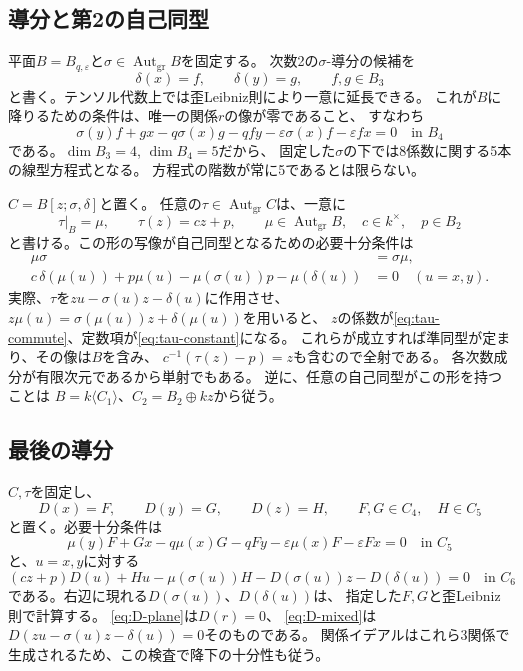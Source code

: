 \documentclass[11pt,a4paper]{ltjsarticle}
\theoremstyle{definition}
\newcommand{\Aut}{\operatorname{Aut}}
\begin{document}
\subsection{導分と第2の自己同型}
平面$B=B_{q,\varepsilon}$と$\sigma\in\Aut_{\mathrm{gr}}B$を固定する。
次数2の$\sigma$-導分の候補を
\[
\delta(x)=f,\qquad \delta(y)=g,\qquad f,g\in B_3
\]
と書く。テンソル代数上では歪Leibniz則により一意に延長できる。
これが$B$に降りるための条件は、唯一の関係$r$の像が零であること、
すなわち
\begin{equation}\label{eq:delta-condition}
\sigma(y)f+gx-q\sigma(x)g-qfy
-\varepsilon\sigma(x)f-\varepsilon fx=0\quad\text{in }B_4
\end{equation}
である。$\dim B_3=4$, $\dim B_4=5$だから、
固定した$\sigma$の下では8係数に関する5本の線型方程式となる。
方程式の階数が常に5であるとは限らない。

$C=B[z;\sigma,\delta]$と置く。
任意の$\tau\in\Aut_{\mathrm{gr}}C$は、一意に
\begin{equation}\label{eq:tau-form}
\tau|_B=\mu,\qquad \tau(z)=cz+p,\qquad
\mu\in\Aut_{\mathrm{gr}}B,\quad c\in k^\times,\quad p\in B_2
\end{equation}
と書ける。この形の写像が自己同型となるための必要十分条件は
\begin{align}
\mu\sigma&=\sigma\mu,\label{eq:tau-commute}\\
c\,\delta(\mu(u))+p\mu(u)
-\mu(\sigma(u))p-\mu(\delta(u))&=0
\quad(u=x,y).\label{eq:tau-constant}
\end{align}
実際、$\tau$を$zu-\sigma(u)z-\delta(u)$に作用させ、
$z\mu(u)=\sigma(\mu(u))z+\delta(\mu(u))$を用いると、
$z$の係数が\eqref{eq:tau-commute}、定数項が\eqref{eq:tau-constant}になる。
これらが成立すれば準同型が定まり、その像は$B$を含み、
$c^{-1}(\tau(z)-p)=z$も含むので全射である。
各次数成分が有限次元であるから単射でもある。
逆に、任意の自己同型がこの形を持つことは
$B=k\langle C_1\rangle$、$C_2=B_2\oplus kz$から従う。

\subsection{最後の導分}
$C,\tau$を固定し、
\[
D(x)=F,\qquad D(y)=G,\qquad D(z)=H,\qquad
F,G\in C_4,\quad H\in C_5
\]
と置く。必要十分条件は
\begin{equation}\label{eq:D-plane}
\mu(y)F+Gx-q\mu(x)G-qFy
-\varepsilon\mu(x)F-\varepsilon Fx=0\quad\text{in }C_5
\end{equation}
と、$u=x,y$に対する
\begin{equation}\label{eq:D-mixed}
(cz+p)D(u)+Hu-\mu(\sigma(u))H
-D(\sigma(u))z-D(\delta(u))=0\quad\text{in }C_6
\end{equation}
である。右辺に現れる$D(\sigma(u))$、$D(\delta(u))$は、
指定した$F,G$と歪Leibniz則で計算する。
\eqref{eq:D-plane}は$D(r)=0$、
\eqref{eq:D-mixed}は$D(zu-\sigma(u)z-\delta(u))=0$そのものである。
関係イデアルはこれら3関係で生成されるため、この検査で降下の十分性も従う。
\end{document}
